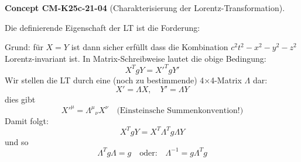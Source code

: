 \documentclass[10pt, letterpaper]{article}
\newcommand{\CustomHeading}[3]{%
  \par\medskip\noindent%
  \textbf{#1 #2} \textnormal{(#3)}.\enskip%
}
\newenvironment{CONC}[2]{\begin{unitbox}\CustomHeading{Concept}{#1}{#2}}{\end{unitbox}}
\begin{document}
\begin{CONC}{CM-K25c-21-04}{Charakterisierung der Lorentz-Transformation}
Die definierende Eigenschaft der LT ist die Forderung:


Grund: für $X = Y$ ist dann sicher erfüllt dass die Kombination $c^2t^2-x^2-y^2-z^2$ Lorentz-invariant ist. In Matrix-Schreibweise lautet die obige Bedingung:
\[ X^T g Y = X'^T g Y' \]
Wir stellen die LT durch eine (noch zu bestimmende) 4×4-Matrix $\Lambda$ dar:
\[ X' = \Lambda X, \quad Y' = \Lambda Y \]
dies gibt
\[  X'^\mu = \Lambda^\mu{}_\nu X^\nu \quad \text{(Einsteinsche Summenkonvention!)} \]
Damit folgt:
\[ X^T g Y = X^T \Lambda^T g \Lambda Y \]
und so 
\[\Lambda^T g \Lambda = g \quad \text{oder:} \quad \Lambda^{-1} = g \Lambda^T g \]
\end{CONC}
\end{document}
